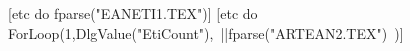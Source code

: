 %
[etc do fparse("EANETI1.TEX")]
[etc do ForLoop(1,DlgValue("EtiCount"),\
  {||fparse("ARTEAN2.TEX")}\
)]

